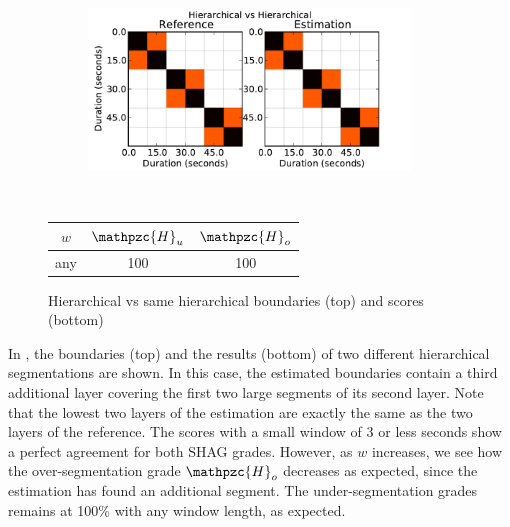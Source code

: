 \documentclass{article}
\def\shag{\ensuremath{\mathpzc{H}}}
\begin{document}
\begin{figure}[t]
  \centering
  \begin{subfigure}{0.5\textwidth}
    \centering
    \includegraphics[width=0.94\textwidth]{plots/hier-hier.pdf}
  \end{subfigure}%
  \\
  \begin{minipage}{0.5\textwidth}
    \centering
    \vspace{10pt}
    \begin{tabular}{|c|c|c|}
      \hline
      $w$       & $\shag_u$    & $\shag_o$      \\
      \hline
      any       & 100       & 100      \\     
      \hline
    \end{tabular}
  \end{minipage}
  \caption{Hierarchical vs same hierarchical boundaries (top) and scores (bottom)}
  \label{fig:hier-hier}
\end{figure}

In , the boundaries (top) and the results (bottom) of two different hierarchical segmentations are shown.
In this case, the estimated boundaries contain a third additional layer covering the first two large segments of its second layer.
Note that the lowest two layers of the estimation are exactly the same as the two layers of the reference.
The scores with a small window of 3 or less seconds show a perfect agreement for both SHAG grades.
However, as $w$ increases, we see how the over-segmentation grade $\shag_o$ decreases as expected, since the estimation has found an additional segment.
The under-segmentation grades remains at 100\% with any window length, as expected.
\end{document}
